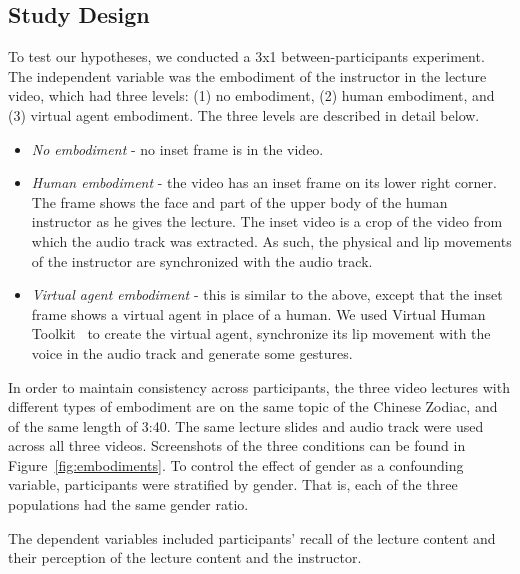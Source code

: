 \documentclass{sigchi}
\begin{document}
\subsection{Study Design}
To test our hypotheses, we conducted a 3x1 between-participants experiment. The independent variable was the embodiment of the instructor in the lecture video, which had three levels: (1) no embodiment, (2) human embodiment, and (3) virtual agent embodiment. The three levels are described in detail below.

\begin{itemize}
\item \textit{No embodiment} - no inset frame is in the video.
\item \textit{Human embodiment} - the video has an inset frame on its lower right corner. The frame shows the face and part of the upper body of the human instructor as he gives the lecture. The inset video is a crop of the video from which the audio track was extracted. As such, the physical and lip movements of the instructor are synchronized with the audio track.
\item \textit{Virtual agent embodiment} - this is similar to the above, except that the inset frame shows a virtual agent in place of a human. We used Virtual Human Toolkit~\cite{DBLP:conf/iva/HartholtTMSSLMG13} to create the virtual agent, synchronize its lip movement with the voice in the audio track and generate some gestures.
\end{itemize}

In order to maintain consistency across participants, the three video lectures with different types of embodiment are on the same topic of the Chinese Zodiac, and of the same length of 3:40. The same lecture slides and audio track were used across all three videos. Screenshots of the three conditions can be found in Figure~\ref{fig:embodiments}. To control the effect of gender as a confounding variable, participants were stratified by gender. That is, each of the three populations had the same gender ratio.

The dependent variables included participants' recall of the lecture content and their perception of the lecture content and the instructor. 

%
%
%
%
\end{document}
